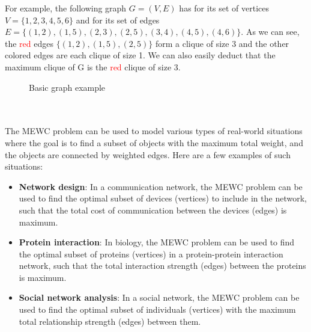 \begin{minipage}{0.5\textwidth}
    For example, the following graph $G=(V,E)$ has for its set of vertices
    $V=\{1,2,3,4,5,6\}$ and for its set of edges
    $E=\{(1,2),(1,5),(2,3),(2,5),(3,4),(4,5),(4,6)\}$.
    As we can see, the \textcolor{red}{red} edges $\{(1,2),(1,5),(2,5)\}$ form a
    clique of size 3 and the other colored edges are each clique of size 1.
    We can also easily deduct that the maximum clique of G is the
    \textcolor{red}{red} clique of size 3.
\end{minipage}
\begin{minipage}{0.5\textwidth}
    \begin{figure}[H]
        \centering
        \caption{Basic graph example}
        \label{fig:basic-graph-example}
    \end{figure}
\end{minipage} \\ \\

The MEWC problem can be used to model various types of real-world situations where
the goal is to find a subset of objects with the maximum total weight, and the
objects are connected by weighted edges. Here are a few examples of such situations:

\begin{itemize}
    \item \textbf{Network design}: In a communication network, the MEWC problem
          can be used to find the optimal subset of devices (vertices) to include in
          the network, such that the total cost of communication between the devices
          (edges) is maximum.
    \item \textbf{Protein interaction}: In biology, the MEWC problem can be used
          to find the optimal subset of proteins (vertices) in a protein-protein
          interaction network, such that the total interaction strength (edges)
          between the proteins is maximum.
    \item \textbf{Social network analysis}: In a social network, the MEWC problem
          can be used to find the optimal subset of individuals (vertices) with
          the maximum total relationship strength (edges) between them.
\end{itemize}